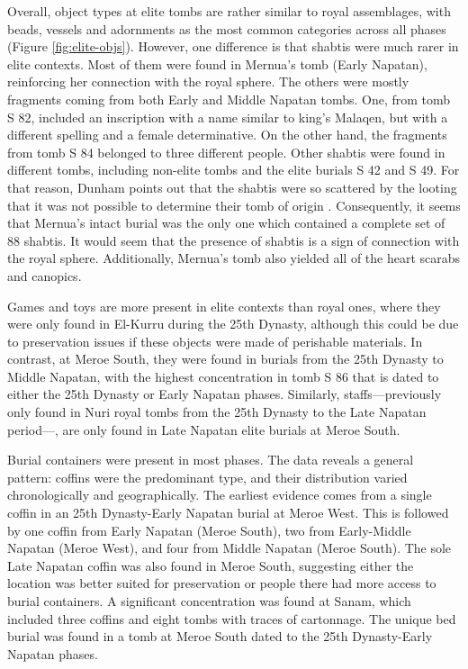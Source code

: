 Overall, object types at elite tombs are rather similar to royal assemblages, with beads, vessels and adornments as the most common categories across all phases (Figure \ref{fig:elite-objs}). However, one difference is that shabtis were much rarer in elite contexts. Most of them were found in Mernua's tomb (Early Napatan), reinforcing her connection with the royal sphere. The others were mostly fragments coming from both Early and Middle Napatan tombs. One, from tomb S 82, included an inscription with a name similar to king's Malaqen, but with a different spelling and a female determinative. On the other hand, the fragments from tomb S 84 belonged to three different people. Other shabtis were found in different tombs, including non-elite tombs and the elite burials S 42 and S 49. For that reason, Dunham points out that the shabtis were so scattered by the looting that it was not possible to determine their tomb of origin \parencites[p.~406-409, 4015-416]{dunhamWestSouthCemeteries1963}. Consequently, it seems that Mernua's intact burial was the only one which contained a complete set of 88 shabtis. It would seem that the presence of shabtis is a sign of connection with the royal sphere. Additionally, Mernua's tomb also yielded all of the heart scarabs and canopics.


Games and toys are more present in elite contexts than royal ones, where they were only found in El-Kurru during the 25th Dynasty, although this could be due to preservation issues if these objects were made of perishable materials. In contrast, at Meroe South, they were found in burials from the 25th Dynasty to Middle Napatan, with the highest concentration in tomb S 86 that is dated to either the 25th Dynasty or Early Napatan phases. Similarly, staffs---previously only found in Nuri royal tombs from the 25th Dynasty to the Late Napatan period---, are only found in Late Napatan elite burials at Meroe South.


Burial containers were present in most phases. The data reveals a general pattern: coffins were the predominant type, and their distribution varied chronologically and geographically. The earliest evidence comes from a single coffin in an 25th Dynasty-Early Napatan burial at Meroe West. This is followed by one coffin from Early Napatan (Meroe South), two from Early-Middle Napatan (Meroe West), and four from Middle Napatan (Meroe South). The sole Late Napatan coffin was also found in Meroe South, suggesting either the location was better suited for preservation or people there had more access to burial containers. A significant concentration was found at Sanam, which included three coffins and eight tombs with traces of cartonnage. The unique bed burial was found in a tomb at Meroe South dated to the 25th Dynasty-Early Napatan phases.


